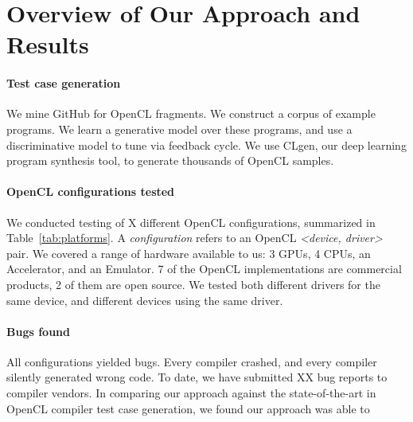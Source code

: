 \section{Overview of Our Approach and Results}\label{sec:overview}

\paragraph{Test case generation} We mine GitHub for OpenCL fragments. We construct a corpus of example programs. We learn a generative model over these programs, and use a discriminative model to tune via feedback cycle. We use CLgen, our deep learning program synthesis tool, to generate thousands of OpenCL samples.

\paragraph{OpenCL configurations tested} We conducted testing of X different OpenCL configurations, summarized in Table~\ref{tab:platforms}. A \emph{configuration} refers to an OpenCL \emph{<device, driver>} pair. We covered a range of hardware available to us: 3 GPUs, 4 CPUs, an Accelerator, and an Emulator. 7 of the OpenCL implementations are commercial products, 2 of them are open source. We tested both different drivers for the same device, and different devices using the same driver.



\paragraph{Bugs found} All configurations yielded bugs. Every compiler crashed, and every compiler silently generated wrong code. To date, we have submitted XX bug reports to compiler vendors. In comparing our approach against the state-of-the-art in OpenCL compiler test case generation, we found our approach was able to \cc{\ldots} 